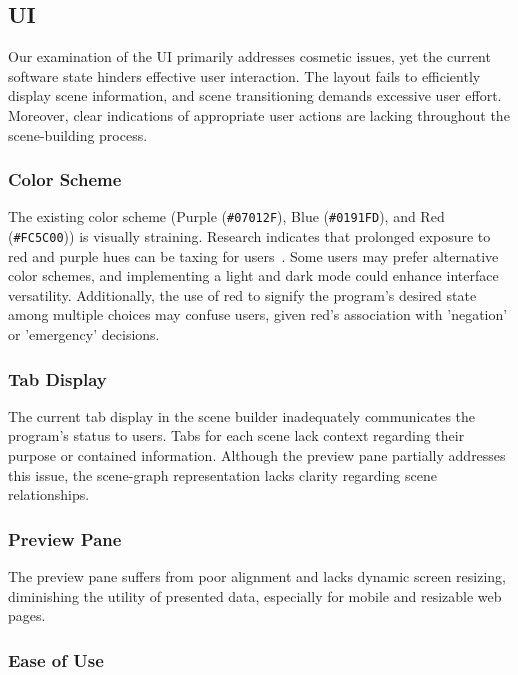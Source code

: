 \documentclass[sigart]{acmart_mod} %
\begin{document}
\subsection{UI}

Our examination of the UI primarily addresses cosmetic issues, yet the current software state hinders effective user interaction. The layout fails to efficiently display scene information, and scene transitioning demands excessive user effort. Moreover, clear indications of appropriate user actions are lacking throughout the scene-building process.

\subsubsection{Color Scheme}

The existing color scheme (Purple (\verb|#07012F|), Blue (\verb|#0191FD|), and Red (\verb|#FC5C00|)) is visually straining. Research indicates that prolonged exposure to red and purple hues can be taxing for users~\cite{jonesHumancomputerInteractionDesign1989}. Some users may prefer alternative color schemes, and implementing a light and dark mode could enhance interface versatility. Additionally, the use of red to signify the program's desired state among multiple choices may confuse users, given red's association with 'negation' or 'emergency' decisions.

\subsubsection{Tab Display}

The current tab display in the scene builder inadequately communicates the program's status to users. Tabs for each scene lack context regarding their purpose or contained information. Although the preview pane partially addresses this issue, the scene-graph representation lacks clarity regarding scene relationships.

\subsubsection{Preview Pane}

The preview pane suffers from poor alignment and lacks dynamic screen resizing, diminishing the utility of presented data, especially for mobile and resizable web pages.

\subsubsection{Ease of Use}
\end{document}
